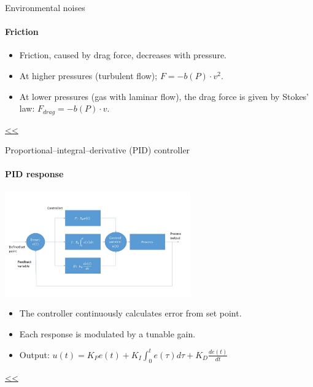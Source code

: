 \documentclass{beamer}
\begin{document}
\begin{frame}{\hypertarget{frame:Environmental noises 2}{Environmental noises}}
	\framesubtitle{Friction}
	\begin{itemize}
		\item Friction, caused by drag force, decreases with pressure.		
		\item At higher pressures (turbulent flow); $F = -b(P)\cdot v^2 $.
		\item At lower pressures (gas with laminar flow), the drag force is given by Stokes' law: $F_{drag} =  -b(P)\cdot v$.	
		
	\end{itemize}
	\hyperlink{frame:Environmental noises}{<<} 
\end{frame}

\begin{frame}{\hypertarget{frame:Proportional–integral–derivative (PID) controller 1}{Proportional–integral–derivative (PID) controller}}
	\framesubtitle{PID response}
	\begin{center}		
		\includegraphics[width=0.6\textwidth,keepaspectratio]{pid_diagram_powerpoint.jpg}
    \end{center}
	\begin{itemize}
		\item The controller continuously calculates error from set point. 
		\item Each response is modulated by a tunable gain. 
		\item Output: $u(t) = K_P e(t)+K_I\int_{0}^{t}e(\tau)d\tau+K_D\frac{de(t)}{dt}$		
	\end{itemize}
	\hyperlink{frame:Proportional–integral–derivative (PID) controller}{<<} 
\end{frame}
\end{document}
